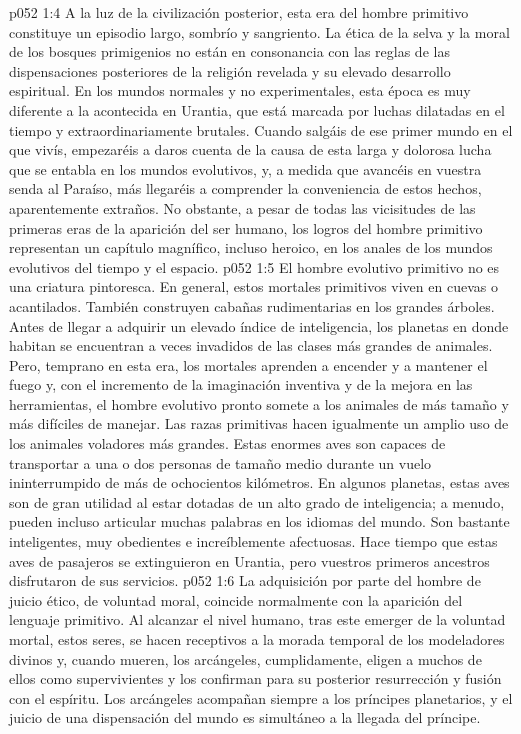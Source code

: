 \vs p052 1:4 A la luz de la civilización posterior, esta era del hombre primitivo constituye un episodio largo, sombrío y sangriento. La ética de la selva y la moral de los bosques primigenios no están en consonancia con las reglas de las dispensaciones posteriores de la religión revelada y su elevado desarrollo espiritual. En los mundos normales y no experimentales, esta época es muy diferente a la acontecida en Urantia, que está marcada por luchas dilatadas en el tiempo y extraordinariamente brutales. Cuando salgáis de ese primer mundo en el que vivís, empezaréis a daros cuenta de la causa de esta larga y dolorosa lucha que se entabla en los mundos evolutivos, y, a medida que avancéis en vuestra senda al Paraíso, más llegaréis a comprender la conveniencia de estos hechos, aparentemente extraños. No obstante, a pesar de todas las vicisitudes de las primeras eras de la aparición del ser humano, los logros del hombre primitivo representan un capítulo magnífico, incluso heroico, en los anales de los mundos evolutivos del tiempo y el espacio.
\vs p052 1:5 \pc El hombre evolutivo primitivo no es una criatura pintoresca. En general, estos mortales primitivos viven en cuevas o acantilados. También construyen cabañas rudimentarias en los grandes árboles. Antes de llegar a adquirir un elevado índice de inteligencia, los planetas en donde habitan se encuentran a veces invadidos de las clases más grandes de animales. Pero, temprano en esta era, los mortales aprenden a encender y a mantener el fuego y, con el incremento de la imaginación inventiva y de la mejora en las herramientas, el hombre evolutivo pronto somete a los animales de más tamaño y más difíciles de manejar. Las razas primitivas hacen igualmente un amplio uso de los animales voladores más grandes. Estas enormes aves son capaces de transportar a una o dos personas de tamaño medio durante un vuelo ininterrumpido de más de ochocientos kilómetros. En algunos planetas, estas aves son de gran utilidad al estar dotadas de un alto grado de inteligencia; a menudo, pueden incluso articular muchas palabras en los idiomas del mundo. Son bastante inteligentes, muy obedientes e increíblemente afectuosas. Hace tiempo que estas aves de pasajeros se extinguieron en Urantia, pero vuestros primeros ancestros disfrutaron de sus servicios.
\vs p052 1:6 \pc La adquisición por parte del hombre de juicio ético, de voluntad moral, coincide normalmente con la aparición del lenguaje primitivo. Al alcanzar el nivel humano, tras este emerger de la voluntad mortal, estos seres, se hacen receptivos a la morada temporal de los modeladores divinos y, cuando mueren, los arcángeles, cumplidamente, eligen a muchos de ellos como supervivientes y los confirman para su posterior resurrección y fusión con el espíritu. Los arcángeles acompañan siempre a los príncipes planetarios, y el juicio de una dispensación del mundo es simultáneo a la llegada del príncipe.
